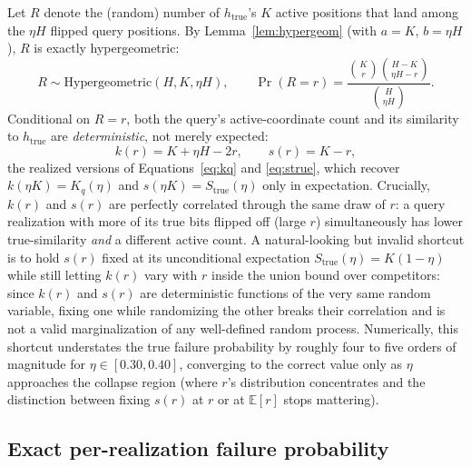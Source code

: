 \documentclass[11pt]{article}
\begin{document}
Let $R$ denote the (random) number of $h_{\text{true}}$'s $K$ active positions that land among
the $\eta H$ flipped query positions. By Lemma~\ref{lem:hypergeom} (with $a=K$, $b=\eta H$), $R$
is exactly hypergeometric:
\[
R \sim \mathrm{Hypergeometric}(H,K,\eta H), \qquad
\Pr(R=r) = \frac{\binom{K}{r}\binom{H-K}{\eta H - r}}{\binom{H}{\eta H}}.
\]
Conditional on $R=r$, both the query's active-coordinate count and its similarity to
$h_{\text{true}}$ are \emph{deterministic}, not merely expected:
\[
k(r) = K + \eta H - 2r, \qquad s(r) = K - r,
\]
the realized versions of Equations~\ref{eq:kq} and \ref{eq:strue}, which recover
$k(\eta K)=K_q(\eta)$ and $s(\eta K)=S_{\text{true}}(\eta)$ only in expectation. Crucially,
$k(r)$ and $s(r)$ are perfectly correlated through the same draw of $r$: a query realization
with more of its true bits flipped off (large $r$) simultaneously has lower true-similarity
\emph{and} a different active count. A natural-looking but invalid shortcut is to hold $s(r)$
fixed at its unconditional expectation $S_{\text{true}}(\eta)=K(1-\eta)$ while still letting
$k(r)$ vary with $r$ inside the union bound over competitors: since $k(r)$ and $s(r)$ are
deterministic functions of the very same random variable, fixing one while randomizing the
other breaks their correlation and is not a valid marginalization of any well-defined random
process. Numerically, this shortcut understates the true failure probability by roughly four to
five orders of magnitude for $\eta \in [0.30, 0.40]$, converging to the correct value only as
$\eta$ approaches the collapse region (where $r$'s distribution concentrates and the distinction
between fixing $s(r)$ at $r$ or at $\mathbb{E}[r]$ stops mattering).

\subsection{Exact per-realization failure probability}
\end{document}
